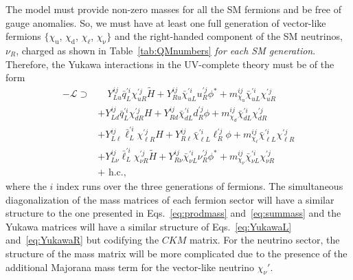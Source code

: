 The model must provide non-zero masses for all the SM fermions and be free of gauge anomalies. So, we must have at least one full generation of vector-like fermions $\{\chi_\mathrm{u}$, $\chi_\mathrm{d}$, $\chi_\mathrm{\ell}$, $\chi_\mathrm{\nu}\}$ and the right-handed component of the SM neutrinos, $\nu_R$, charged as shown in Table~\ref{tab:QMnumbers} \textit{for each SM generation}. Therefore, the Yukawa interactions in the UV-complete theory must be of the form
\begin{equation}
    \begin{aligned}
        -\mathcal{L}
        \supset&\quad
        Y_{L u}^{ij} \bar{q}_L^{\prime i} \chi_{u R}^{\prime j} \widetilde{H}
        + Y_{R u}^{ij} \bar{\chi}_{u L}^{\prime i} u_R^{\prime j} \phi^*  
        + m_{\chi_\mathrm{u}}^{ij} \bar{\chi}_{u L}^{\prime i} \chi_{u R}^{\prime j}
        \\&
        +Y_{L d}^{ij} \bar{q}_L^{\prime i} \chi_{d R}^{\prime j} H 
        +Y_{R d}^{ij} \bar{\chi}_{d L}^{\prime i} d_R^{\prime j} \phi
        +m_{\chi_d}^{ij} \bar{\chi}_{d L}^{\prime i} \chi_{d R}^{\prime j}
        \\&
        +Y_{L \ell}^{ij} \bar{\ell}_L^{\prime i} \chi_{\ell R}^{\prime j} H
        +Y_{R \ell}^{ij} \bar{\chi}_{\ell L}^{\prime i} \ell_R^{\prime j} \phi
        +m_{\chi_\ell}^{ij} \bar{\chi}_{\ell L}^{\prime i} \chi_{\ell R}^{\prime j}
        \\
        &
        +Y_{L \nu}^{ij} \bar{\ell}_L^{\prime i} \chi_{\nu R}^{\prime j} \widetilde{H}
        +Y_{R \nu}^{ij} \bar{\chi}_{\nu L}^{\prime i} \nu_R^{\prime j} \phi^*
        +m_{\chi_\nu}^{ij} \bar{\chi}_{\nu L}^{\prime i} \chi_{\nu R}^{\prime j} \\
        &+\text { h.c., }
    \end{aligned}
\end{equation}
where the $i$ index runs over the three generations of fermions. The simultaneous diagonalization of the mass matrices of each fermion sector will have a similar structure to the one presented in Eqs.~\ref{eq:prodmass} and~\ref{eq:summass} and the Yukawa matrices will have a similar structure of Eqs.~\ref{eq:YukawaL} and~\ref{eq:YukawaR} but codifying the $CKM$ matrix. For the neutrino sector, the structure of the mass matrix will be more complicated due to the presence of the additional Majorana mass term for the vector-like neutrino $\chi_\nu'$.

